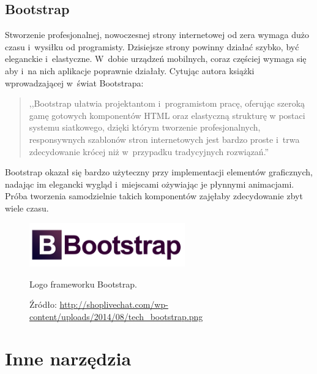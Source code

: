 \documentclass[a4paper,12pt,oneside]{mwrep}  %
\begin{document}
\subsection{Bootstrap}
Stworzenie profesjonalnej, nowoczesnej strony internetowej od zera wymaga dużo czasu i~wysiłku od programisty. Dzisiejsze strony powinny działać szybko, być eleganckie i~elastyczne. W~dobie urządzeń mobilnych, coraz częściej wymaga się aby i~na nich aplikacje poprawnie działały. Cytując autora książki wprowadzającej w~świat Bootstrapa:
\begin{quote}
,,Bootstrap ułatwia projektantom i~programistom
pracę, oferując szeroką gamę gotowych komponentów HTML oraz elastyczną strukturę
w postaci systemu siatkowego, dzięki którym tworzenie profesjonalnych, responsywnych
szablonów stron internetowych jest bardzo proste i~trwa zdecydowanie krócej niż w~przypadku tradycyjnych rozwiązań.'' \cite{bootstrap}
\end{quote}
Bootstrap okazał się bardzo użyteczny przy implementacji elementów graficznych, nadając im elegancki wygląd i~miejscami ożywiając je płynnymi animacjami. Próba tworzenia samodzielnie takich komponentów zajęłaby zdecydowanie zbyt wiele czasu.

\begin{figure}[h]
\centering
\includegraphics[width=0.6\textwidth]{grafika/loga/bootstrap.png}
\caption{Logo frameworku Bootstrap.}
\vspace{-0.8cm}
\caption*{\scriptsize Źródło: \url{http://shoplivechat.com/wp-content/uploads/2014/08/tech_bootstrap.png}}
\label{bootstrap}
\end{figure}

\section{Inne narzędzia}
\end{document}
